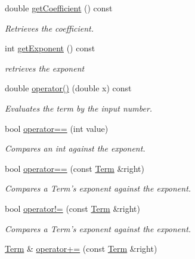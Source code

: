 \begin{DoxyCompactItemize}
\item 
double \hyperlink{classTerm_a155053b3506f434c6c788deb46b58eca}{getCoefficient} () const 
\begin{DoxyCompactList}\small\item\em Retrieves the coefficient. \item\end{DoxyCompactList}\item 
int \hyperlink{classTerm_a4366a4bde58427fde228da9f95505a78}{getExponent} () const 
\begin{DoxyCompactList}\small\item\em retrieves the exponent \item\end{DoxyCompactList}\item 
double \hyperlink{classTerm_ab89ea23f82711d4fc9f4608d0937ce31}{operator()} (double x) const 
\begin{DoxyCompactList}\small\item\em Evaluates the term by the input number. \item\end{DoxyCompactList}\item 
bool \hyperlink{classTerm_a8e563a63ca972c9d2cffacb471a611a5}{operator==} (int value)
\begin{DoxyCompactList}\small\item\em Compares an int against the exponent. \item\end{DoxyCompactList}\item 
bool \hyperlink{classTerm_a22d1367b67d2c2d2762392463decde13}{operator==} (const \hyperlink{classTerm}{Term} \&right)
\begin{DoxyCompactList}\small\item\em Compares a Term's exponent against the exponent. \item\end{DoxyCompactList}\item 
bool \hyperlink{classTerm_afa3f759f8bf094001d4b979999e40696}{operator!=} (const \hyperlink{classTerm}{Term} \&right)
\begin{DoxyCompactList}\small\item\em Compares a Term's exponent against the exponent. \item\end{DoxyCompactList}\item 
\hyperlink{classTerm}{Term} \& \hyperlink{classTerm_a596ebc6a2a6a32b2fc7396ed2cc1ed99}{operator+=} (const \hyperlink{classTerm}{Term} \&right)

\end{DoxyCompactItemize}
